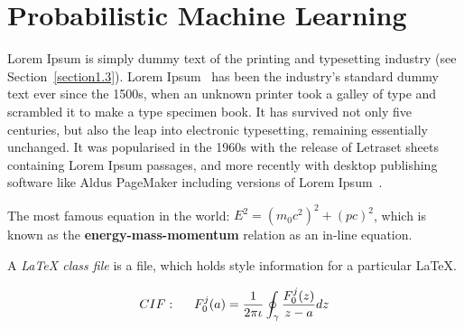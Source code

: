 \section{Probabilistic Machine Learning} %

Lorem Ipsum is simply dummy text of the printing and typesetting industry (see 
Section~\ref{section1.3}). Lorem Ipsum~\citep{Aup91} has been the industry's 
standard dummy text ever since the 1500s, when an unknown printer took a galley 
of type and scrambled it to make a type specimen book. It has survived not only 
five centuries, but also the leap into electronic typesetting, remaining 
essentially unchanged. It was popularised in the 1960s with the release of 
Letraset sheets containing Lorem Ipsum passages, and more recently with desktop 
publishing software like Aldus PageMaker including versions of Lorem 
Ipsum~\citep{AAB95,Con90,LM65}.

The most famous equation in the world: $E^2 = (m_0c^2)^2 + (pc)^2$, which is 
known as the \textbf{energy-mass-momentum} relation as an in-line equation.

A {\em \LaTeX{} class file} is a file, which holds style information for a particular \LaTeX{}.


\begin{align}
CIF: \hspace*{5mm}F_0^j(a) = \frac{1}{2\pi \iota} \oint_{\gamma} \frac{F_0^j(z)}{z - a} dz
\end{align}

\nomenclature[g-p]{$\pi$}{ $\simeq 3.14\ldots$}                                             %


